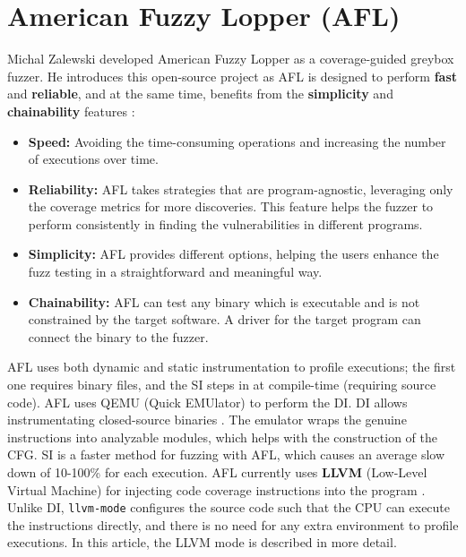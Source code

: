\section{American Fuzzy Lopper (AFL)} \label{sec:2-afl}

Michal Zalewski developed American Fuzzy Lopper as a coverage-guided greybox fuzzer. He introduces this open-source project as  \cite{zalewski2014american} AFL is designed to perform \textbf{fast} and \textbf{reliable}, and at the same time, benefits from the \textbf{simplicity} and \textbf{chainability} features \cite{about_afl}:

\begin{itemize}
    \item \textbf{Speed:} Avoiding the time-consuming operations and increasing the number of executions over time.
    \item \textbf{Reliability:} AFL takes strategies that are program-agnostic, leveraging only the coverage metrics for more discoveries. This feature helps the fuzzer to perform consistently in finding the vulnerabilities in different programs.
    \item \textbf{Simplicity:} AFL provides different options, helping the users enhance the fuzz testing in a straightforward and meaningful way. 
    \item \textbf{Chainability:} AFL can test any binary which is executable and is not constrained by the target software. A driver for the target program can connect the binary to the fuzzer.
\end{itemize}

AFL uses both dynamic and static instrumentation to profile executions; the first one requires binary files, and the SI steps in at compile-time (requiring source code). AFL uses QEMU (Quick EMUlator) to perform the DI. DI allows instrumentating closed-source binaries \cite{afl_qemu}. The emulator wraps the genuine instructions into analyzable modules, which helps with the construction of the CFG. SI is a faster method for fuzzing with AFL, which causes an average slow down of 10-100\% for each execution. AFL currently uses \textbf{LLVM} (Low-Level Virtual Machine) for injecting code coverage instructions into the program \cite{afl-llvm}. Unlike DI, \texttt{llvm-mode} configures the source code such that the CPU can execute the instructions directly, and there is no need for any extra environment to profile executions. In this article, the LLVM mode is described in more detail.

